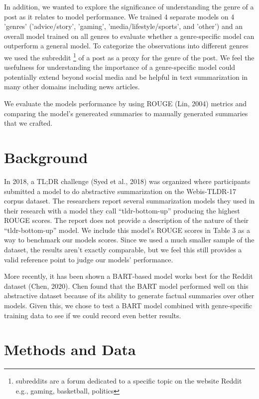 \documentclass[11pt,a4paper, twocolumn]{article}
\begin{document}
In addition, we wanted to explore the significance of understanding the genre of a post as it relates to model performance. We trained 4 separate models on 4 'genres' ('advice/story', 'gaming', 'media/lifestyle/sports', and 'other') and an overall model trained on all genres to evaluate whether a genre-specific model can outperform a general model. To categorize the observations into different genres we used the subreddit \footnote{subreddits are a forum dedicated to a specific topic on the website Reddit e.g., gaming, basketball, politics} of a post as a proxy for the genre of the post. We feel the usefulness for understanding the importance of a genre-specific model could potentially extend beyond social media and be helpful in text summarization in many other domains including news articles.

We evaluate the models performance by using ROUGE (Lin, 2004) metrics and comparing the model's genereated summaries to manually generated summaries that we crafted.




\section{Background}
\label{sec:length}

In 2018, a TL;DR challenge (Syed et al., 2018) was organized where participants submitted a model to do abstractive summarization on the Webis-TLDR-17 corpus dataset. The researchers report several summarization models they used in their research with a model they call “tldr-bottom-up” producing the highest ROUGE scores. The report does not provide a description of the nature of their “tldr-bottom-up” model. We include this model’s ROUGE scores in Table 3 as a way to benchmark our models scores. Since we used a much smaller sample of the dataset, the results aren’t exactly comparable, but we feel this still provides a valid reference point to judge our models’ performance.

More recently, it has been shown a BART-based model works best for the Reddit dataset (Chen, 2020). Chen found that the BART model performed well on this abstractive dataset because of its ability to generate factual summaries over other models. Given this, we chose to test a BART model combined with genre-specific training data to see if we could record even better results.

\section{Methods and Data}
\end{document}
